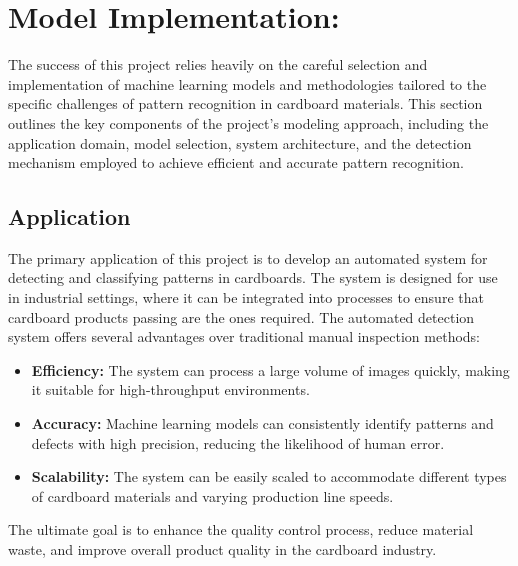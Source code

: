 \section{Model Implementation:}

The success of this project relies heavily on the careful selection and implementation of machine learning models and methodologies tailored to the specific challenges of pattern recognition in cardboard materials. This section outlines the key components of the project's modeling approach, including the application domain, model selection, system architecture, and the detection mechanism employed to achieve efficient and accurate pattern recognition.

\subsection{Application}

The primary application of this project is to develop an automated system for detecting and classifying patterns in cardboards. The system is designed for use in industrial settings, where it can be integrated into processes to ensure that cardboard products passing are the ones required. The automated detection system offers several advantages over traditional manual inspection methods:


\begin{itemize}
	\item \textbf{Efficiency:} The system can process a large volume of images quickly, making it suitable for high-throughput environments.
	\item \textbf{Accuracy:} Machine learning models can consistently identify patterns and defects with high precision, reducing the likelihood of human error.
	\item \textbf{Scalability:} The system can be easily scaled to accommodate different types of cardboard materials and varying production line speeds.
	
\end{itemize}

The ultimate goal is to enhance the quality control process, reduce material waste, and improve overall product quality in the cardboard industry.


